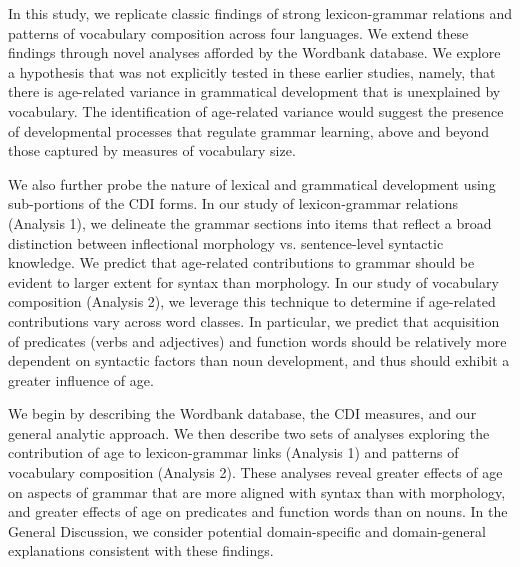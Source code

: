 \documentclass[10pt,letterpaper]{article}
\begin{document}

In this study, we replicate classic findings of strong lexicon-grammar relations and patterns of vocabulary composition across four languages. We extend these findings through novel analyses afforded by the Wordbank database. We explore a hypothesis that was not explicitly tested in these earlier studies, namely, that there is age-related variance in grammatical development that is unexplained by vocabulary. The identification of age-related variance would suggest the presence of developmental processes that regulate grammar learning, above and beyond those captured by measures of vocabulary size.

We also further probe the nature of lexical and grammatical development using sub-portions of the CDI forms. In our study of lexicon-grammar relations (Analysis 1), we delineate the grammar sections into items that reflect a broad distinction between inflectional morphology vs. sentence-level syntactic knowledge. We predict that age-related contributions to grammar should be evident to larger extent for syntax than morphology. In our study of vocabulary composition (Analysis 2), we leverage this technique to determine if age-related contributions vary across word classes. In particular, we predict that acquisition of predicates (verbs and adjectives) and function words should be relatively more dependent on syntactic factors than noun development, and thus should exhibit a greater influence of age.


We begin by describing the Wordbank database, the CDI measures, and our general analytic approach. We then describe two sets of analyses exploring the contribution of age to lexicon-grammar links (Analysis 1) and patterns of vocabulary composition (Analysis 2). These analyses reveal greater effects of age on aspects of grammar that are more aligned with syntax than with morphology, and greater effects of age on predicates and function words than on nouns. In the General Discussion, we consider potential domain-specific and domain-general explanations consistent with these findings.
\end{document}
